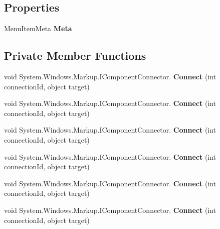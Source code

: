 \subsection*{Properties}
\begin{DoxyCompactItemize}
\item 
Menu\+Item\+Meta {\bfseries Meta}
\end{DoxyCompactItemize}
\subsection*{Private Member Functions}
\begin{DoxyCompactItemize}
\item 
\mbox{\label{class_t_h_b___plugin___exams_1_1_exams_monitor_1_1_page_a8abf501e85bd4a89570f586faf58195e}} 
void System.\+Windows.\+Markup.\+I\+Component\+Connector. {\bfseries Connect} (int connection\+Id, object target)
\item 
\mbox{\label{class_t_h_b___plugin___exams_1_1_exams_monitor_1_1_page_a8abf501e85bd4a89570f586faf58195e}} 
void System.\+Windows.\+Markup.\+I\+Component\+Connector. {\bfseries Connect} (int connection\+Id, object target)
\item 
\mbox{\label{class_t_h_b___plugin___exams_1_1_exams_monitor_1_1_page_a8abf501e85bd4a89570f586faf58195e}} 
void System.\+Windows.\+Markup.\+I\+Component\+Connector. {\bfseries Connect} (int connection\+Id, object target)
\item 
\mbox{\label{class_t_h_b___plugin___exams_1_1_exams_monitor_1_1_page_a8abf501e85bd4a89570f586faf58195e}} 
void System.\+Windows.\+Markup.\+I\+Component\+Connector. {\bfseries Connect} (int connection\+Id, object target)
\item 
\mbox{\label{class_t_h_b___plugin___exams_1_1_exams_monitor_1_1_page_a8abf501e85bd4a89570f586faf58195e}} 
void System.\+Windows.\+Markup.\+I\+Component\+Connector. {\bfseries Connect} (int connection\+Id, object target)
\item 
\mbox{\label{class_t_h_b___plugin___exams_1_1_exams_monitor_1_1_page_a8abf501e85bd4a89570f586faf58195e}} 
void System.\+Windows.\+Markup.\+I\+Component\+Connector. {\bfseries Connect} (int connection\+Id, object target)
\end{DoxyCompactItemize}
